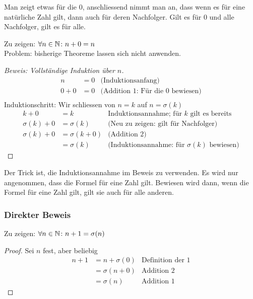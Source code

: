 Man zeigt etwas für die 0, anschliessend nimmt man an, dass wenn es für eine
natürliche Zahl gilt, dann auch für deren Nachfolger. Gilt es für 0 und alle Nachfolger, gilt es für alle.

Zu zeigen: $\forall n \in \mathbb{N} \colon n + 0 = n$\\
Problem: bisherige Theoreme lassen sich nicht anwenden.\\
\begin{proof}[Beweis: Vollständige Induktion über $n$]
	\begin{align*}
		n	& = 0	& \mbox{(Induktionsanfang)}\\
		0 + 0& = 0	& \mbox{(Addition 1: Für die 0 bewiesen)}\\
	\end{align*}
	Induktionschritt: Wir schliessen von $n = k$ auf $n = \sigma(k)$
	\begin{align*}
		k + 0 	& = k	& \mbox{Induktionsannahme; für $k$ gilt es bereits}\\
		\sigma(k) + 0	& = \sigma(k)		& \mbox{(Neu zu zeigen: gilt für Nachfolger)}\\
		\sigma(k) + 0	& = \sigma(k + 0)	& \mbox{(Addition 2)}\\
						& = \sigma(k)		& \mbox{(Induktionsannahme: für $\sigma(k)$ bewiesen)}
	\end{align*}
\end{proof}
Der Trick ist, die Induktionsannahme im Beweis zu verwenden. Es wird nur angenommen, dass die Formel für eine Zahl gilt.
Bewiesen wird dann, wenn die Formel für eine Zahl gilt, gilt sie auch für alle anderen.

\subsubsection{Direkter Beweis}
Zu zeigen: $\forall n \in \mathbb{N} \colon n + 1 = \sigma(n)$
\begin{proof}
	Sei $n$ fest, aber beliebig
	\begin{align*}
	n + 1	& = n + \sigma(0) &\mbox{Definition der 1}\\
			& = \sigma(n + 0)	& \mbox{Addition 2}\\
			& = \sigma(n)		& \mbox{Addition 1}
	\end{align*}
\end{proof}



